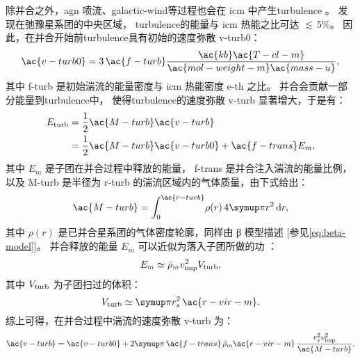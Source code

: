 除并合之外，\ac{agn} 喷流、\ac{galactic-wind}等过程也会在 \ac{icm}
中产生\ac{turbulence} \cite{vazza2011}。
 发现在弛豫星系团的中央区域，
\ac{turbulence}的能量与 \ac{icm} 热能之比可达 $\lesssim\,$5\%。
因此，在并合开始前\ac{turbulence}具有初始的速度弥散 \ac{v-turb0}：
\begin{equation}
  \label{eq:v-turb0}
  \ac{v-turb0}
    = 3 \,\ac{f-turb} \frac{\ac{kb} \ac{T-cl-m}}{
        \ac{mol-weight-m} \ac{mass-u}} ,
\end{equation}
其中
\ac{f-turb} 是初始湍流的能量密度与 \ac{icm} 热能密度 \ac{e-th} 之比。
并合会贡献一部分能量到\ac{turbulence}中，
使得\ac{turbulence}的速度弥散 \ac{v-turb} 显著增大，于是有：
\begin{align}
  \label{eq:energy-turb}
  E_{\R{turb}}
    & = \frac{1}{2} \ac{M-turb} \ac{v-turb}  \\
    & = \frac{1}{2} \ac{M-turb} \ac{v-turb0} + \ac{f-trans} E_m ,
\end{align}
其中
$E_m$ 是子团在并合过程中释放的能量，
\ac{f-trans} 是并合注入湍流的能量比例，
以及 \ac{M-turb} 是半径为 \ac{r-turb} 的湍流区域内的气体质量，由下式给出：
\begin{equation}
  \ac{M-turb} = \int_0^{\ac{r-turb}} \! \rho(r) \,4\Cpi r^2 \,\D{r} ,
\end{equation}
其中 $\rho(r)$ 是已并合星系团的气体密度轮廓，同样由 β 模型描述
[参见\autoref{eq:beta-model}]。
并合释放的能量 $E_m$ 可以近似为落入子团所做的功 \cite{fujita2003,cassano2005}：
\begin{equation}
  \label{eq:energy-inj}
  E_m \simeq \bar{\rho}_m v_{\mathrm{imp}}^2 V_{\mathrm{turb}} ,
\end{equation}
其中 $V_{\mathrm{turb}}$ 为子团扫过的体积：
\begin{equation}
  V_{\R{turb}} \simeq \Cpi r_s^2 \,\ac{r-vir-m} .
\end{equation}
综上可得，在并合过程中湍流的速度弥散 \ac{v-turb} 为：
\begin{equation}
  \ac{v-turb}
    = \ac{v-turb0}
    + 2 \Cpi\,\ac{f-trans}\, \bar{\rho}_m \ac{r-vir-m}
      \,\frac{r_s^2 v_{\R{imp}}^2}{\ac{M-turb}} .
\end{equation}

